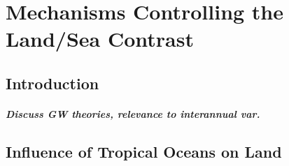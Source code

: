 \chapter{Mechanisms Controlling the Land/Sea Contrast} 

\label{mechanisms} 


\section{Introduction}
\paragraph{Discuss GW theories, relevance to interannual var.}


\section{Influence of Tropical Oceans on Land}

